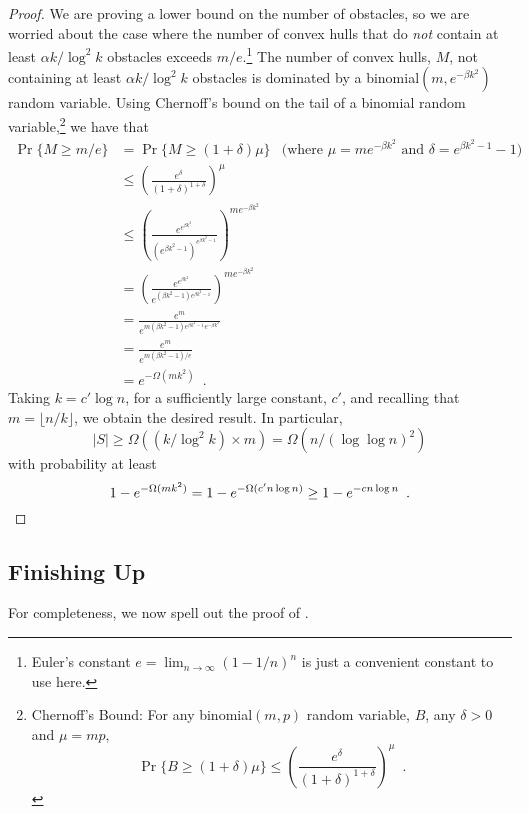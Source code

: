 \documentclass{patmorin}
\begin{document}
\begin{proof}
  We are proving a lower bound on the number of obstacles, so we are
  worried about the case where the number of convex hulls that do
  \emph{not} contain at least $\alpha k/\log^2 k$ obstacles exceeds
  $m/e$.\footnote{Euler's constant $e=\lim_{n\rightarrow \infty}
  (1-1/n)^n$ is just a convenient constant to use here.} The number of
  convex hulls, $M$, not containing at least $\alpha k/\log^2 k$ obstacles
  is dominated by a binomial$(m,e^{-\beta k^2})$ random variable.
  Using Chernoff's bound on the tail of a binomial random
  variable,\footnote{%
    Chernoff's Bound: For any binomial$(m,p)$ random variable, $B$,
    any $\delta>0$ and $\mu=mp$, 
    \[ \Pr\{B\ge (1+\delta)\mu\}
       \le \left(\frac{e^{\delta}}{(1+\delta)^{1+\delta}}\right)^{\mu} 
         \enspace . 
    \]
  }
  we have that
  \begin{align*}
    \Pr\{M \ge m/e\} & = \Pr\{M\ge (1+\delta)\mu\}
      & \text{(where $\mu=me^{-\beta k^2}$ and $\delta=e^{\beta k^2-1}-1$)} \\
      & \le \left(\frac{e^{\delta}}{(1+\delta)^{1+\delta}}\right)^{\mu} \\
      & \le \left(\frac{e^{e^{\beta k^2}}}{(e^{\beta k^2-1})^{e^{\beta k^2-1}}}\right)^{me^{-\beta k^2}}\\
      & = \left(\frac{e^{e^{\beta k^2}}}{e^{(\beta k^2-1)e^{\beta k^2-1}}}\right)^{me^{-\beta k^2}}\\
      & = \frac{e^{m}}{e^{m(\beta k^2-1)e^{\beta k^2-1}e^{-\beta k^2}}} \\
      & = \frac{e^{m}}{e^{m(\beta k^2-1)/e}} \\
      & = e^{-\Omega(mk^2)} \enspace .
  \end{align*}
  Taking $k=c'\log n$, for a sufficiently large constant, $c'$, and
  recalling that $m=\lfloor n/k\rfloor$, we obtain
  the desired result.  In particular,
  \[
      |S| \ge \Omega\left(\left(k/\log^2 k\right)\times m \right)
        = \Omega\left(n/(\log\log n)^2\right)
  \]
  with probability at least
  \[
      1-e^{-\Omega(mk^2)} = 1-e^{-\Omega(c'n\log n)} \ge 1-e^{-cn\log n} \enspace . \qedhere
  \]
\end{proof}

\subsection{Finishing Up}

For completeness, we now spell out the proof of .
\end{document}
